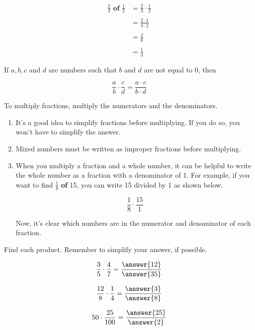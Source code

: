 \documentclass{ximera}[font=12pt]
\begin{document}
\begin{align*}
  \frac{2}{3} \textbf{ of } \frac{1}{2} &= \frac{2}{3} \cdot \frac{1}{2} \\
  & \\
  &= \frac{2 \cdot 1}{3 \cdot 2 } \\
  & \\
  &= \frac{2}{6} \\
  &  \\
  &= \frac{1}{3}
\end{align*}

\begin{procedure}

If $a, b, c$ and $d$ are numbers such that $b$ and $d$ are not equal to 0, then

\[ \frac{a}{b} \cdot \frac{c}{d} = \frac{a \cdot c}{b \cdot d} \]


To multiply fractions, multiply the numerators and the denominators.

\end{procedure}

\begin{remark}
\begin{enumerate}
\item It's a good idea to simplify fractions before multiplying.  If you do so, you
won't have to simplify the answer.

\item Mixed numbers must be written as improper fractions before multiplying.

\item When you multiply a fraction and a whole number, it can be helpful to write the whole
number as a fraction with a denominator of 1.  For example, if you want to find $\textstyle \frac{1}{8}$ \textbf{of} 15, you can write 15
divided by 1 as shown below.

\[ \frac{1}{8} \cdot \frac{15}{1} \]

Now, it's clear which numbers are in the numerator and denominator of each fraction.

\end{enumerate}
\end{remark}

\begin{problem}
Find each product.  Remember to simplify your answer, if possible.

\[ \frac{3}{5} \cdot \frac{4}{7} = \frac{\answer{12}}{\answer{35}} \]

\[ \frac{12}{8} \cdot \frac{1}{4} = \frac{\answer{3}}{\answer{8}} \]

\[ 50 \cdot \frac{25}{100} = \frac{\answer{25}}{\answer{2}} \]

\end{problem}
\end{document}
